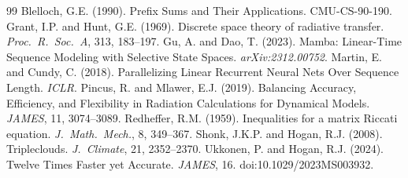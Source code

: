 \documentclass[12pt,letterpaper]{article}
\begin{document}
\begin{thebibliography}{99}
 Blelloch, G.E. (1990). Prefix Sums and Their Applications. CMU-CS-90-190.
 Grant, I.P. and Hunt, G.E. (1969). Discrete space theory of radiative transfer. \textit{Proc.\ R.\ Soc.\ A}, 313, 183--197.
 Gu, A. and Dao, T. (2023). Mamba: Linear-Time Sequence Modeling with Selective State Spaces. \textit{arXiv:2312.00752}.
 Martin, E. and Cundy, C. (2018). Parallelizing Linear Recurrent Neural Nets Over Sequence Length. \textit{ICLR}.
 Pincus, R. and Mlawer, E.J. (2019). Balancing Accuracy, Efficiency, and Flexibility in Radiation Calculations for Dynamical Models. \textit{JAMES}, 11, 3074--3089.
 Redheffer, R.M. (1959). Inequalities for a matrix Riccati equation. \textit{J.\ Math.\ Mech.}, 8, 349--367.
 Shonk, J.K.P. and Hogan, R.J. (2008). Tripleclouds. \textit{J.\ Climate}, 21, 2352--2370.
 Ukkonen, P. and Hogan, R.J. (2024). Twelve Times Faster yet Accurate. \textit{JAMES}, 16. doi:10.1029/2023MS003932.
\end{thebibliography}
\end{document}
